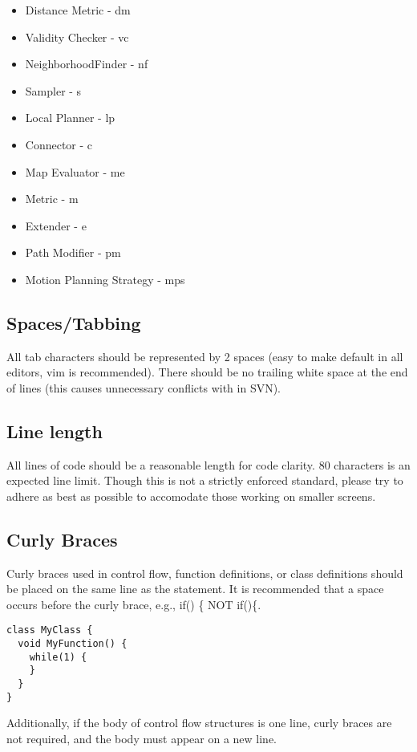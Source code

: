 \documentclass[12pt]{article}
\begin{document}
\begin{itemize}
  \item Distance Metric - dm
  \item Validity Checker - vc
  \item NeighborhoodFinder - nf
  \item Sampler - s
  \item Local Planner - lp
  \item Connector - c
  \item Map Evaluator - me
  \item Metric - m
  \item Extender - e
  \item Path Modifier - pm
  \item Motion Planning Strategy - mps
\end{itemize}

\subsection{Spaces/Tabbing}
All tab characters should be represented by 2 spaces (easy to make default in
all editors, vim is recommended). There should be no trailing white space at the
end of lines (this causes unnecessary conflicts with in SVN).

\subsection{Line length}
All lines of code should be a reasonable length for code clarity. 80 characters
is an expected line limit. Though this is not a strictly enforced standard,
please try to adhere as best as possible to accomodate those working on smaller
screens.

\subsection{Curly Braces}
Curly braces used in control flow, function definitions, or class definitions
should be placed on the same line as the statement. It is recommended that a
space occurs before the curly brace, e.g., if() \{ NOT if()\{.

\begin{lstlisting}
class MyClass {
  void MyFunction() {
    while(1) {
    }
  }
}
\end{lstlisting}

Additionally, if the body of control flow structures is one line, curly braces
are not required, and the body must appear on a new line.
\end{document}
